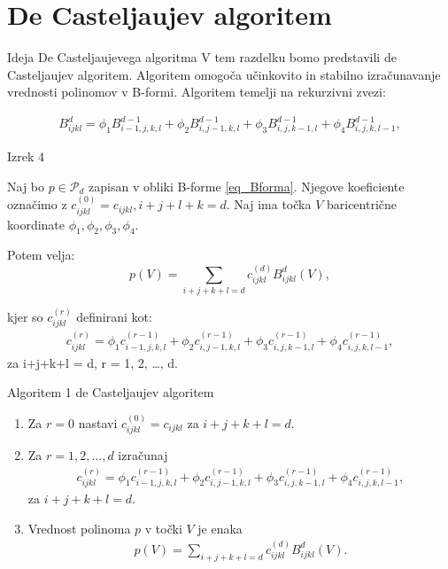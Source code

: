 \documentclass{beamer}
\begin{document}
\section{De Casteljaujev algoritem}
\begin{frame}{Ideja De Casteljaujevega algoritma}
V tem razdelku bomo predstavili de Casteljaujev algoritem. Algoritem omogoča učinkovito in stabilno izračunavanje vrednosti polinomov v B-formi. Algoritem temelji na rekurzivni zvezi:

\begin{align*}
 B_{ijkl}^d = \phi_1 B_{i-1,j,k,l}^{d-1} + \phi_2 B_{i,j-1,k,l}^{d-1} + \phi_3 B_{i,j,k-1,l}^{d-1} + \phi_4 B_{i,j,k,l-1}^{d-1}, 
\end{align*}
\end{frame}


\begin{frame}{Izrek 4}
\begin{theorem}
    Naj bo $p \in \mathcal{P}_d$ zapisan v obliki B-forme \eqref{eq_Bforma}. Njegove koeficiente označimo z $c_{ijkl}^{(0)} = c_{ijkl}, i+j+l+k = d$.
    Naj ima točka $V$ baricentrične koordinate $\phi_1, \phi_2, \phi_3, \phi_4$.

    Potem velja:
    $$
    p(V) = \sum_{i+j+k+l = d} c_{ijkl}^{(d)} B_{ijkl}^d(V),
    $$

    kjer so  $c_{ijkl}^{(r)}$ definirani kot:
    \begin{align*}
        c_{ijkl}^{(r)} = \phi_1 c_{i-1,j,k,l}^{(r-1)} + \phi_2 c_{i,j-1,k,l}^{(r-1)} + \phi_3 c_{i,j,k-1,l}^{(r-1)} + \phi_4 c_{i,j,k,l-1}^{(r-1)},
    \end{align*}
    za i+j+k+l = d, r = 1, 2, \ldots, d.
\end{theorem}
\end{frame}


\begin{frame}{Algoritem 1}
de Casteljaujev algoritem
    \begin{enumerate}
        \item Za $r = 0$ nastavi $c_{ijkl}^{(0)} = c_{ijkl}$ za $i+j+k+l = d$.
        \item Za $r = 1, 2, \ldots, d$ izračunaj
        \begin{align*}
            c_{ijkl}^{(r)} = \phi_1 c_{i-1,j,k,l}^{(r-1)} + \phi_2 c_{i,j-1,k,l}^{(r-1)} + \phi_3 c_{i,j,k-1,l}^{(r-1)} + \phi_4 c_{i,j,k,l-1}^{(r-1)},
        \end{align*}
        za $i+j+k+l = d$.
        \item Vrednost polinoma $p$ v točki $V$ je enaka
        \begin{align*}
            p(V) = \sum_{i+j+k+l = d} c_{ijkl}^{(d)} B_{ijkl}^d(V).
        \end{align*}
    \end{enumerate}

\end{frame}
\end{document}
